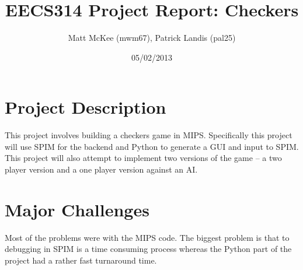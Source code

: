 \documentclass[]{article}
\title{EECS314 Project Report: Checkers}
\author{Matt McKee (mwm67), Patrick Landis (pal25)}
\date{05/02/2013}
\begin{document}
\maketitle

\section*{Project Description}
This project involves building a checkers game in MIPS. Specifically this project will use SPIM for the backend and Python to generate a GUI and input to SPIM. This project will also attempt to implement two versions of the game -- a two player version and a one player version against an AI.

\section*{Major Challenges}
Most of the problems were with the MIPS code. The biggest problem is that to debugging in SPIM is a time consuming process whereas the Python part of the project had a rather fast turnaround time.
\end{document}
